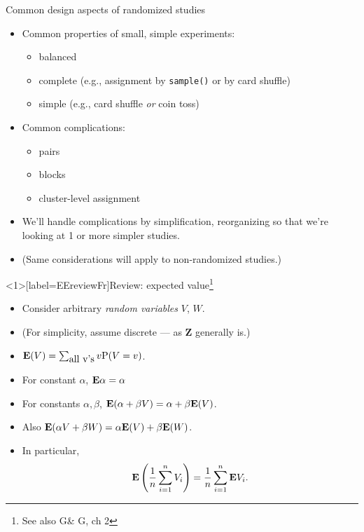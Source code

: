 \begin{frame}{Common design aspects of randomized studies} 
  \begin{itemize}
  \item<1-> Common properties of small, simple experiments:
    \begin{itemize}
    \item balanced 
    \item complete (e.g., assignment by \texttt{sample()} or by card shuffle)
    \item simple (e.g., card shuffle \textit{or} coin toss)
    \end{itemize}
  \item<2-> Common complications:
    \begin{itemize}
    \item<2-> pairs
    \item<2-> blocks
    \item<2-> cluster-level assignment
    \end{itemize}
  \item<3-> We'll handle complications by simplification, reorganizing so that we're looking at 1 or more simpler studies.
  \item<4-> (Same considerations will apply to non-randomized studies.)
  \end{itemize}

\end{frame}


\begin{frame}<1>[label=EEreviewFr]{Review: expected value\footnote{See also G\& G, ch 2}}

  \begin{itemize}
  \item Consider arbitrary \textit{random variables} $V$, $W$.
  \item (For simplicity, assume discrete --- as $\mathbf{Z}$ generally is.)
  \item  $\mathbf{E}(V) = \sum_{\mbox{all v's}} v\mathrm{P}(V=v) $.
  \item<2-> For constant $\alpha$, $\mathbf{E}  \alpha = \alpha$
  \item<2-> For constants $\alpha, \beta$, $\mathbf{E} (\alpha + \beta V) =
    \alpha + \beta\mathbf{E}(V)$.
  \item<2-> Also $\mathbf{E}(\alpha V + \beta W) = \alpha \mathbf{E}(V) + \beta \mathbf{E}(W)$. 
  \item<3-> In particular, 
$$\mathbf{E}\left(\frac{1}{n} \sum_{i=1}^n V_i\right) = \frac{1}{n}
\sum_{i=1}^n \mathbf{E} V_i.$$
  \end{itemize}


\end{frame}

